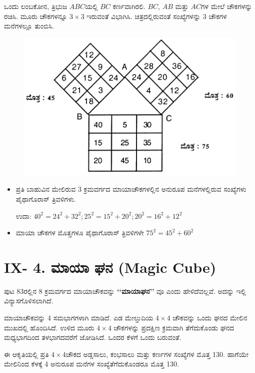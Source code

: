 \medskip
ಒಂದು ಲಂಬಕೋನ, ತ್ರಿಭುಜ $ABC$ಯಲ್ಲಿ $BC$ ಕರ್ಣವಾಗಿರಲಿ. $BC$, $AB$ ಮತ್ತು $AC$ಗಳ ಮೇಲೆ ಚೌಕಗಳನ್ನು ರಚಿಸಿ. ಮೂರು ಚೌಕಗಳನ್ನೂ $3 \times 3$ ಇರುವಂತೆ \break ವಿಭಾಗಿಸಿ. ಚಿತ್ರದಲ್ಲಿರುವಂತೆ ಸಂಖ್ಯೆಗಳನ್ನು 3 ಚೌಕಗಳ ಮನೆಗಳಲ್ಲೂ ತುಂಬಿಸಿ.
\begin{figure}[H]
\includegraphics[scale=1.2]{src/figures/chap8/fig8-10.jpg}
\end{figure}
\begin{itemize}
	\item ಪ್ರತಿ ಬಾಹುವಿನ ಮೇಲಿರುವ 3 ಕ್ರಮವರ್ಗದ ಮಾಯಾಚೌಕಗಳಲ್ಲಿನ ಅನುರೂಪ ಮನೆಗಳಲ್ಲಿರುವ ಸಂಖ್ಯೆಗಳು ಪೈಥಾಗೊರಾಸ್ ತ್ರಿವಳಿಗಳು.

	ಉದಾ: $40^2 = 24^2 +32^2 ; 25^2 =15^2 +20^2 ; 20^2 =16^2+12^2$\smallskip
	\item ಮಾಯಾ ಚೌಕಗಳ ಮೊತ್ತಗಳೂ ಪೈಥಾಗೊರಾಸ್ ತ್ರಿವಳಿಗಳೇ $75^2 =45^2 +60^2$
\end{itemize}
\eject

\section*{IX- 4. ಮಾಯಾ ಘನ (Magic Cube)}

ಪುಟ 83ರಲ್ಲಿನ 8 ಕ್ರಮವರ್ಗದ ಮಾಯಾಚೌಕವನ್ನು \textbf{‘‘ಮಾಯಾಘನ’’} ವೂ ಎಂದು ಹೇಳಿದೆವಲ್ಲವೆ. ಅದನ್ನು ಇಲ್ಲಿ ವಿನ್ಯಾಸಗೊಳಿಸಲಾಗಿದೆ.

ಮಾಯಾಚೌಕವನ್ನು 4 ಸಮಭಾಗಗಳಾಗಿ ಮಾಡಿದೆ. ಎಡ ಮೇಲ್ತುದಿಯ $4 \times 4$ ಚೌಕ\-ವನ್ನು ಒಂದು ಘನದ ಮೇಲಿನ ಮುಖದಲ್ಲಿ ಹೊಂದಿಸಿದೆ. ಉಳಿದ ಮೂರು $4 \times 4$ ಚೌಕ\-ಗಳನ್ನು ಪ್ರದಕ್ಷಿಣ ಕ್ರಮವಾಗಿ ತೆಗೆದುಕೊಂಡು ಘನದ ಮಧ್ಯಭಾಗದಿಂದ ತಳಭಾಗದವರೆಗೆ ಜೋಡಿಸಿದೆ. ಒಂದರ ಕೆಳಗೆ ಒಂದು ಬರುವಂತೆ.

ಈ ಆಕೃತಿಯಲ್ಲಿ ಪ್ರತಿ $4 \times 4$ಚೌಕದ ಅಡ್ಡಸಾಲು, ಕಂಭಸಾಲು ಮತ್ತು ಕರ್ಣಗಳ ಸಂಖ್ಯೆ\-ಗಳ ಮೊತ್ತ 130. ಹಾಗೆಯೇ ಮೇಲಿನಿಂದ ಕೆಳಕ್ಕೆ 4 ಅನುರೂಪ ಮನೆಗಳ ಸಂಖ್ಯೆತೆಗೆದು\-ಕೊಂಡರೂ ಮೊತ್ತ 130.

